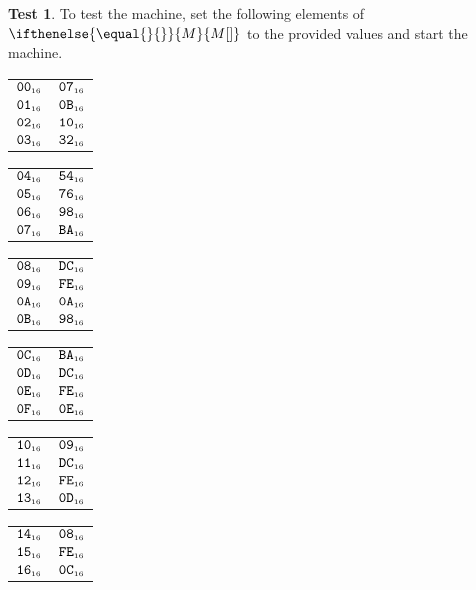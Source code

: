 \documentclass[a4paper,12pt]{article}
\makeatletter
\newcommand{\num}[1]{\texttt{#1}}
\newcommand{\hex}[1]{\num{#1}_{\textup{\tiny 16}}}
\newcommand{\MEM}[1]{\ifthenelse{\equal{#1}{}}{M}{M[#1]}}
\theoremstyle{definition}
\newtheorem{test}{Test}
\newenvironment{memtable}{%
  \begin{trivlist}
    \item
    }{%
    \end{trivlist}}
\newenvironment{memcolumn}{%
  \begin{tabular}{@{}ll@{}}
    \hline}
    {%
    \hline
  \end{tabular}}
\newcommand{\memspace}{\qquad}
\makeatother
\begin{document}
\begin{test}
  To test the machine, set the following elements of $\MEM{}$ to the provided values and start the machine.
  \begin{memtable}
    \begin{memcolumn}
      $\hex{00}$ & $\hex{07}$ \\
      $\hex{01}$ & $\hex{0B}$ \\
      $\hex{02}$ & $\hex{10}$ \\
      $\hex{03}$ & $\hex{32}$ \\
    \end{memcolumn}
    \memspace
    \begin{memcolumn}
      $\hex{04}$ & $\hex{54}$ \\
      $\hex{05}$ & $\hex{76}$ \\
      $\hex{06}$ & $\hex{98}$ \\
      $\hex{07}$ & $\hex{BA}$ \\
    \end{memcolumn}
    \memspace
    \begin{memcolumn}
      $\hex{08}$ & $\hex{DC}$ \\
      $\hex{09}$ & $\hex{FE}$ \\
      $\hex{0A}$ & $\hex{0A}$ \\
      $\hex{0B}$ & $\hex{98}$ \\
    \end{memcolumn}
    \memspace
    \begin{memcolumn}
      $\hex{0C}$ & $\hex{BA}$ \\
      $\hex{0D}$ & $\hex{DC}$ \\
      $\hex{0E}$ & $\hex{FE}$ \\
      $\hex{0F}$ & $\hex{0E}$ \\
    \end{memcolumn}
    \memspace
    \begin{memcolumn}
      $\hex{10}$ & $\hex{09}$ \\
      $\hex{11}$ & $\hex{DC}$ \\
      $\hex{12}$ & $\hex{FE}$ \\
      $\hex{13}$ & $\hex{0D}$ \\
    \end{memcolumn}
    \memspace
    \begin{memcolumn}
      $\hex{14}$ & $\hex{08}$ \\
      $\hex{15}$ & $\hex{FE}$ \\
      $\hex{16}$ & $\hex{0C}$ \\

\end{memcolumn}
\end{memtable}
\end{test}
\end{document}
